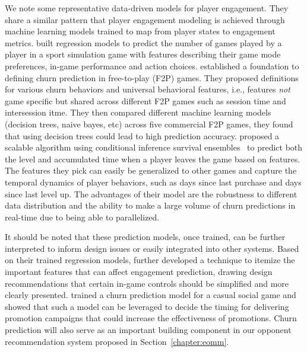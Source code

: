 

%  
We note some representative data-driven models for player engagement. They share a similar pattern that player engagement modeling is achieved through machine learning models trained to map from player states to engagement metrics.  \textcite{weber2011modeling} built  regression models to predict the number of games played by a player in a sport simulation game with features describing their game mode preferences, in-game performance and action choices.  \textcite{hadiji2014predicting} established a foundation to defining churn prediction in free-to-play (F2P) games. They proposed definitions for various churn behaviors and universal behavioral features, i.e., features \textit{not} game specific but shared across different F2P games such as session time and intersession itme. They then compared different machine learning models (decision trees, naive bayes, etc) across five commercial F2P games, they found that using decision trees could lead to high prediction accuracy.   \textcite{bertens2017games} proposed a scalable algorithm using conditional inference survival ensembles~\citep{hothorn2006unbiased} to predict both the level and accumulated time when a player leaves the game based on features.  The features they pick can easily be
generalized to other games and capture the temporal dynamics
of player behaviors, such as days since last purchase and days since last level up. The advantages of their model are the robustness to different data distribution and the ability to make a large volume of churn predictions in real-time due to being able to parallelized.

It should be noted that these prediction models, once trained, can be further interpreted to inform design issues or easily integrated into other systems. Based on their trained regression models, \textcite{weber2011using} further developed a technique to itemize the important features that can affect engagement prediction, drawing design recommendations that certain in-game controls should be simplified and more clearly presented. 
\textcite{runge2014churn} trained a churn prediction model for a casual social game and showed that such a model can be leveraged to decide the timing for delivering promotion campaigns that could increase the effectiveness of promotions. Churn prediction will also serve as an important building component in our opponent recommendation system proposed in Section~\ref{chapter:eomm}. 

